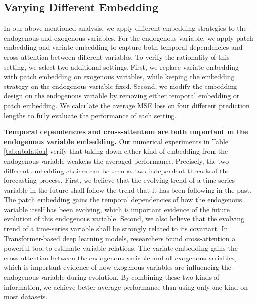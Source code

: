 \documentclass[nohyperref]{article}
\theoremstyle{plain}
\theoremstyle{definition}
\theoremstyle{remark}
\begin{document}
\subsection{Varying Different Embedding}

In our above-mentioned analysis, we apply different embedding strategies to the endogenous and exogenous variables. For the endogenous variable, we apply patch embedding and variate embedding to capture both temporal dependencies and cross-attention between different variables. To verify the rationality of this setting, we select two additional settings. First, we replace variate embedding with patch embedding on exogenous variables, while keeping the embedding strategy on the endogenous variable fixed. Second, we modify the embedding design on the endogenous variable by removing either temporal embedding or patch embedding. We calculate the average MSE loss on four different prediction lengths to fully evaluate the performance of each setting.

\textbf{Temporal dependencies and cross-attention are both important in the endogenous variable embedding.} Our numerical experiments in Table \ref{tab:abalation} verify that taking down either kind of embedding from the endogenous variable weakens the averaged performance. Precisely, the two different embedding choices can be seen as two independent threads of the forecasting process. First, we believe that the evolving trend of a time-series variable in the future shall follow the trend that it has been following in the past. The patch embedding gains the temporal dependencies of how the endogenous variable itself has been evolving, which is important evidence of the future evolution of this endogenous variable. Second, we also believe that the evolving trend of a time-series variable shall be strongly related to its covariant. In Transformer-based deep learning models, researchers found cross-attention a powerful tool to estimate variable relations. The variate embedding gains the cross-attention between the endogenous variable and all exogenous variables, which is important evidence of how exogenous variables are influencing the endogenous variable during evolution. By combining these two kinds of information, we achieve better average performance than using only one kind on most datasets.
\end{document}

